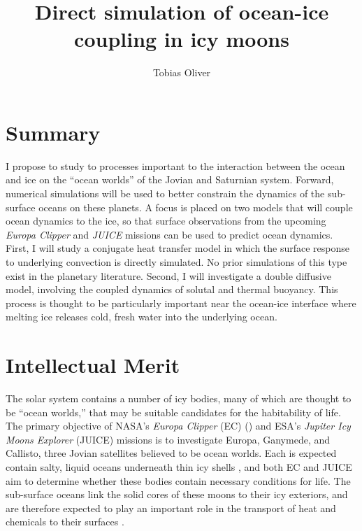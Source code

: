 \documentclass{article}
\title{Direct simulation of ocean-ice coupling in icy moons}
\author{Tobias Oliver}
\date{}
\begin{document}
\newcommand{\citep}[1]{\cite{#1}}
\maketitle
\section{Summary}
I propose to study to processes important to the interaction between the ocean and ice on the ``ocean worlds'' of the Jovian and Saturnian system. Forward, numerical simulations will be used to better constrain the dynamics of the sub-surface oceans on these planets. A focus is placed on two models that will couple ocean dynamics to the ice, so that surface observations from the upcoming \textit{Europa Clipper} and \textit{JUICE} missions can be used to predict ocean dynamics.
First, I will study a conjugate heat transfer model in which the surface response to underlying convection is directly simulated. No prior simulations of this type exist in the planetary literature. Second, I will investigate a double diffusive model, involving the coupled dynamics of solutal and thermal buoyancy. This process is thought to be particularly important near the ocean-ice interface where melting ice releases cold, fresh water into the underlying ocean.
\section{Intellectual Merit}
The solar system contains a number of icy bodies, many of which are thought to be ``ocean worlds,'' that may be suitable candidates for the habitability of life.
The primary objective of NASA's \textit{Europa Clipper} (EC) (\cite{pC14_JUICE}) and ESA's \textit{Jupiter Icy Moons Explorer} (JUICE)\citep{oG13} missions is to investigate Europa, Ganymede, and Callisto, three Jovian satellites believed to be ocean worlds. Each is expected contain salty, liquid oceans underneath thin icy shells \citep{rP99,fN16}, and both EC and JUICE aim to determine whether these bodies contain necessary conditions for life\citep{tB24}.
The sub-surface oceans link the solid cores of these moons to their icy exteriors, and are therefore expected to play an important role in the transport of heat and chemicals to their surfaces \citep{kS20}. 
\end{document}
